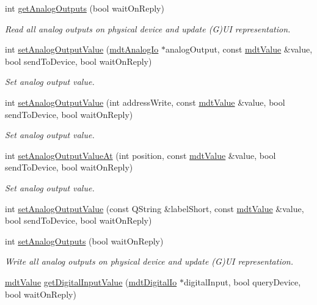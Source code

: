 \begin{DoxyCompactItemize}
\item 
int \hyperlink{classmdt_device_a78a8968cf61c1cac518b0a8af471110c}{get\-Analog\-Outputs} (bool wait\-On\-Reply)
\begin{DoxyCompactList}\small\item\em Read all analog outputs on physical device and update (G)U\-I representation. \end{DoxyCompactList}\item 
int \hyperlink{classmdt_device_a766d9adcf8c2274f61f120a4a5c5c6d9}{set\-Analog\-Output\-Value} (\hyperlink{classmdt_analog_io}{mdt\-Analog\-Io} $\ast$analog\-Output, const \hyperlink{classmdt_value}{mdt\-Value} \&value, bool send\-To\-Device, bool wait\-On\-Reply)
\begin{DoxyCompactList}\small\item\em Set analog output value. \end{DoxyCompactList}\item 
int \hyperlink{classmdt_device_ab605f81f28271f54570f151e94039807}{set\-Analog\-Output\-Value} (int address\-Write, const \hyperlink{classmdt_value}{mdt\-Value} \&value, bool send\-To\-Device, bool wait\-On\-Reply)
\begin{DoxyCompactList}\small\item\em Set analog output value. \end{DoxyCompactList}\item 
int \hyperlink{classmdt_device_a2db6bcd6d69cba9e8be0e68388d75030}{set\-Analog\-Output\-Value\-At} (int position, const \hyperlink{classmdt_value}{mdt\-Value} \&value, bool send\-To\-Device, bool wait\-On\-Reply)
\begin{DoxyCompactList}\small\item\em Set analog output value. \end{DoxyCompactList}\item 
int \hyperlink{classmdt_device_a40b49f882622c37f50a57132f954e732}{set\-Analog\-Output\-Value} (const Q\-String \&label\-Short, const \hyperlink{classmdt_value}{mdt\-Value} \&value, bool send\-To\-Device, bool wait\-On\-Reply)
\item 
int \hyperlink{classmdt_device_a57e1cee7e670469035c57e3bd2ff4c9d}{set\-Analog\-Outputs} (bool wait\-On\-Reply)
\begin{DoxyCompactList}\small\item\em Write all analog outputs on physical device and update (G)U\-I representation. \end{DoxyCompactList}\item 
\hyperlink{classmdt_value}{mdt\-Value} \hyperlink{classmdt_device_afe8bd7811ccc4a2ba8088edf073e0a8d}{get\-Digital\-Input\-Value} (\hyperlink{classmdt_digital_io}{mdt\-Digital\-Io} $\ast$digital\-Input, bool query\-Device, bool wait\-On\-Reply)

\end{DoxyCompactItemize}
